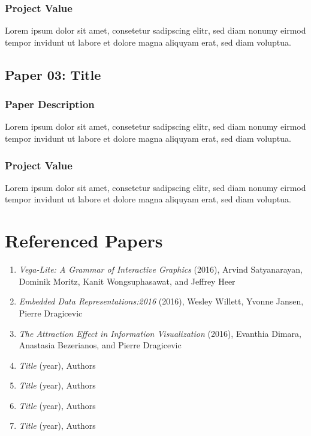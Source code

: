 \documentclass[journal]{vgtc}                %
\begin{document}
        \subsubsection{Project Value}
        Lorem ipsum dolor sit amet, consetetur sadipscing elitr, sed diam nonumy eirmod tempor invidunt ut labore et dolore magna aliquyam erat, sed diam voluptua.

    \subsection{Paper 03: Title}
        \subsubsection{Paper Description}
        Lorem ipsum dolor sit amet, consetetur sadipscing elitr, sed diam nonumy eirmod tempor invidunt ut labore et dolore magna aliquyam erat, sed diam voluptua.
        \subsubsection{Project Value}
        Lorem ipsum dolor sit amet, consetetur sadipscing elitr, sed diam nonumy eirmod tempor invidunt ut labore et dolore magna aliquyam erat, sed diam voluptua.

\section{Referenced Papers}
    \begin{enumerate}
        \item{\textit{Vega-Lite: A Grammar of Interactive Graphics} (2016), Arvind Satyanarayan, Dominik Moritz, Kanit Wongsuphasawat, and Jeffrey Heer \cite{VegaLite:2016}}
        \item{\textit{Embedded Data Representations:2016} (2016), Wesley Willett, Yvonne Jansen, Pierre Dragicevic \cite{EmbeddedDataRepresentations:2016}}
        \item{\textit{The Attraction Effect in Information Visualization} (2016), Evanthia Dimara, Anastasia Bezerianos, and Pierre Dragicevic \cite{AttractionEffect:2016}}
        \item{\textit{Title} (year), Authors \cite{key}}
        \item{\textit{Title} (year), Authors \cite{key}}
        \item{\textit{Title} (year), Authors \cite{key}}
        \item{\textit{Title} (year), Authors \cite{key}}
    \end{enumerate}




\nocite{*}
%
%
%

%


\end{document}
